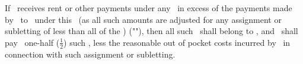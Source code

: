 If \lessee\ receives rent or other payments under any \permittedtransfer\ in excess of the payments made by \lessee\ to \lessor\ under this \amendmentTitle\ (as all such amounts are adjusted for any assignment or subletting of less than all of the \property) ("\excessrent"), then all such \excessrent\ shall belong to \lessee, and \lessee\ shall pay \lessor\ one-half ($\displaystyle\frac{1}{2}$) such \excessrent, less the reasonable out of pocket costs incurred by \lessee\ in connection with such assignment or subletting.
